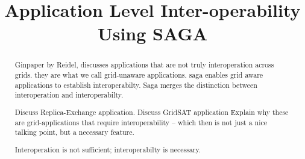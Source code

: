 \documentclass[conference,final]{IEEEtran}
\begin{document}
\title{\large Application Level Inter-operability Using  SAGA}


\author{}

\maketitle

\begin{abstract}

Ginpaper by Reidel, discusses applications that are not truly
interoperation across grids. they are what we call grid-unaware
applications. saga enables grid aware applications to establish
interoperabilty.  Saga merges the distinction between interoperation
and interoperabilty.

Discuss Replica-Exchange application. Discuss GridSAT application
Explain why these are grid-applications that require 
interoperability -- which then is not just a nice talking point, but
a necessary feature. 

Interoperation is not sufficient; interoperabilty is necessary.

\end{abstract}
\end{document}
